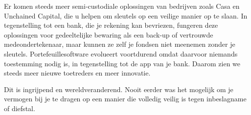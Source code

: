Er komen steeds meer semi-custodiale oplossingen van bedrijven zoals Casa en Unchained Capital, die u helpen om sleutels op een veilige manier op te slaan. In tegenstelling tot een bank, die je rekening kan bevriezen, fungeren deze oplossingen voor gedeeltelijke bewaring als een back-up of vertrouwde medeondertekenaar, maar kunnen ze zelf je fondsen niet meenemen zonder je sleutels. Portefeuillesoftware evolueert voortdurend omdat daarvoor niemands toestemming nodig is, in tegenstelling tot de app van je bank. Daarom zien we steeds meer nieuwe toetreders en meer innovatie. 

Dit is ingrijpend en wereldveranderend. Nooit eerder was het mogelijk om je vermogen bij je te dragen op een manier die volledig veilig is tegen inbeslagname of diefstal. 


